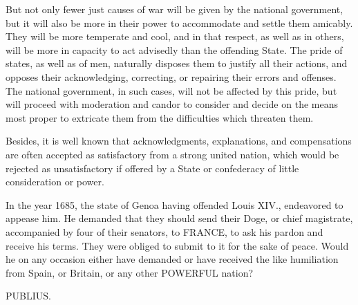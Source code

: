 But not only fewer just causes of war will be given by the
national government, but it will also be more in their power to
accommodate and settle them amicably. They will be more temperate
and cool, and in that respect, as well as in others, will be more in
capacity to act advisedly than the offending State. The pride of
states, as well as of men, naturally disposes them to justify all
their actions, and opposes their acknowledging, correcting, or
repairing their errors and offenses. The national government, in
such cases, will not be affected by this pride, but will proceed
with moderation and candor to consider and decide on the means most
proper to extricate them from the difficulties which threaten them.

Besides, it is well known that acknowledgments, explanations,
and compensations are often accepted as satisfactory from a strong
united nation, which would be rejected as unsatisfactory if offered
by a State or confederacy of little consideration or power.

In the year 1685, the state of Genoa having offended Louis XIV.,
endeavored to appease him. He demanded that they should send their
Doge, or chief magistrate, accompanied by four of their
senators, to FRANCE, to ask his pardon and receive his terms. They
were obliged to submit to it for the sake of peace. Would he on any
occasion either have demanded or have received the like humiliation
from Spain, or Britain, or any other POWERFUL nation?

PUBLIUS.

